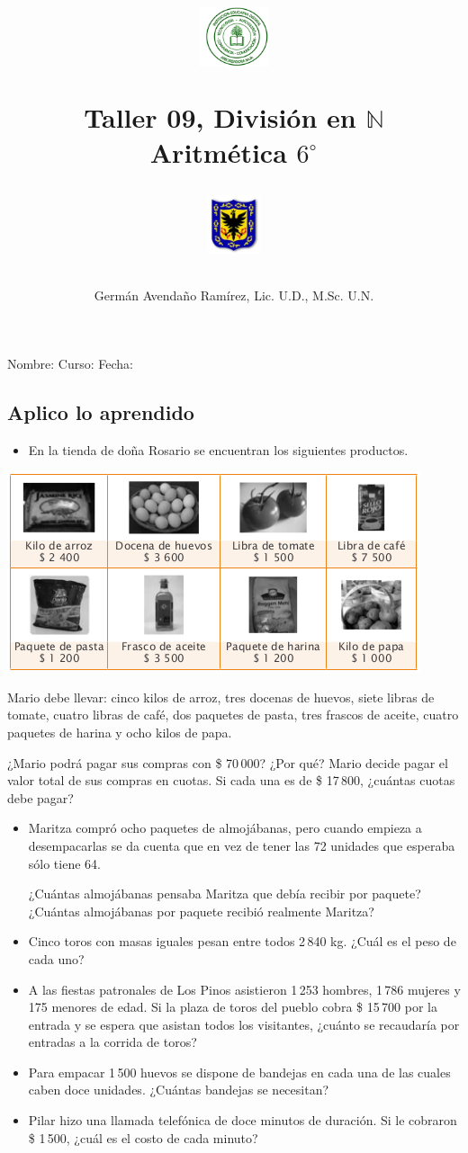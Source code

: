 \documentclass[letterpaper,11pt,twoside]{article}
\author{Germ\'an Avenda\~no Ram\'irez, Lic. U.D., M.Sc. U.N.}
\title{\begin{minipage}{.2\textwidth}
\includegraphics[height=1.75cm]{Images/logo-colegio.png}\end{minipage}
\begin{minipage}{.55\textwidth}
\begin{center}
Taller 09, Divisi\'{o}n en $\mathbb{N}$\\
Aritm\'{e}tica $6^{\circ}$
\end{center}
\end{minipage}\hfill
\begin{minipage}{.2\textwidth}
\includegraphics[height=1.75cm]{Images/logo-sed.png} 
\end{minipage}}
\date{}
\begin{document}
\maketitle
Nombre: \hrulefill Curso: \underline{\hspace*{44pt}} Fecha: \underline{\hspace*{2.5cm}}
\begin{multicols}{2}
 \section*{Aplico lo aprendido}
 \begin{itemize}
 \item En la tienda de doña Rosario se encuentran los
siguientes productos.
\end{itemize}
\begin{center}
\includegraphics[scale=.55]{Images/productos.png} 
\end{center}
Mario debe llevar: cinco kilos de arroz, tres docenas de
huevos, siete libras de tomate, cuatro libras de café, dos
paquetes de pasta, tres frascos de aceite, cuatro paquetes
de harina y ocho kilos de papa.

¿Mario podrá pagar sus compras con \$ 70\,000? ¿Por qué?
Mario decide pagar el valor total de sus compras en cuotas.
Si cada una es de \$ 17\,800, ¿cuántas cuotas debe pagar?
\begin{itemize}
\item Maritza compró ocho paquetes de almojábanas, pero
cuando empieza a desempacarlas se da cuenta que en vez
de tener las 72 unidades que esperaba sólo tiene 64.

¿Cuántas almojábanas pensaba Maritza que debía recibir
por paquete? ¿Cuántas almojábanas por paquete recibió
realmente Maritza?
\item Cinco toros con masas iguales pesan entre todos 2\,840
kg. ¿Cuál es el peso de cada uno?
\item A las fiestas patronales de Los Pinos asistieron 1\,253 hombres, 1\,786 mujeres y 175 menores de edad. Si la
plaza de toros del pueblo cobra \$ 15\,700 por la entrada
y se espera que asistan todos los visitantes, ¿cuánto se
recaudaría por entradas a la corrida de toros?
\item Para empacar 1\,500 huevos se dispone de bandejas en
cada una de las cuales caben doce unidades. ¿Cuántas
bandejas se necesitan?
\item Pilar hizo una llamada telefónica de doce minutos de
duración. Si le cobraron \$ 1\,500, ¿cuál es el costo de
cada minuto?
 \end{itemize}
 
\end{multicols}
\end{document}
